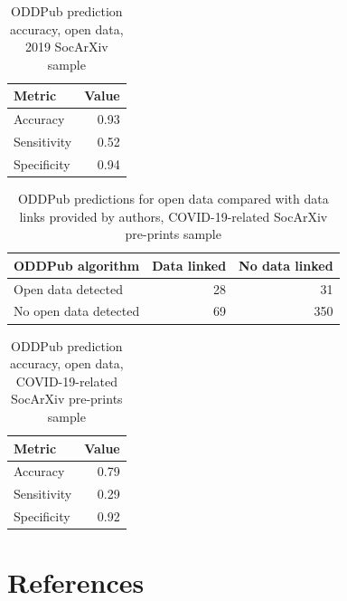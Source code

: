 \documentclass[
]{article}
\begin{document}
\begin{table}

\caption{\label{tab:accuracy-2019}ODDPub prediction accuracy, open data, 2019 SocArXiv sample}
\centering
\begin{tabular}[t]{lr}
\toprule
Metric & Value\\
\midrule
Accuracy & 0.93\\
Sensitivity & 0.52\\
Specificity & 0.94\\
\bottomrule
\end{tabular}
\end{table}

\begin{table}[!h]

\caption{\label{tab:confusion-matrix-2020}ODDPub predictions for open data compared with data links provided by authors, COVID-19-related SocArXiv pre-prints sample}
\centering
\begin{tabular}[t]{lrr}
\toprule
ODDPub algorithm & Data linked & No data linked\\
\midrule
Open data detected & 28 & 31\\
No open data detected & 69 & 350\\
\bottomrule
\end{tabular}
\end{table}

\begin{table}[!h]

\caption{\label{tab:accuracy-2020}ODDPub prediction accuracy, open data, COVID-19-related SocArXiv pre-prints sample}
\centering
\begin{tabular}[t]{lr}
\toprule
Metric & Value\\
\midrule
Accuracy & 0.79\\
Sensitivity & 0.29\\
Specificity & 0.92\\
\bottomrule
\end{tabular}
\end{table}

\newpage

\hypertarget{references}{%
\section*{References}\label{references}}
\end{document}
